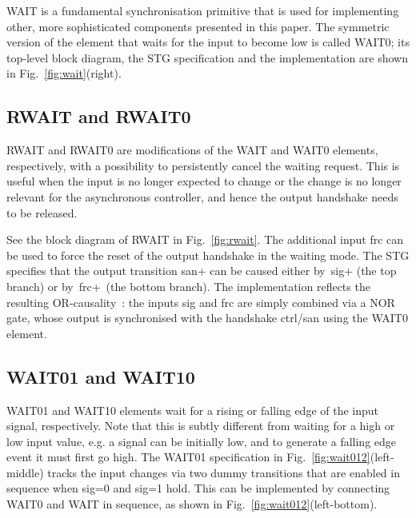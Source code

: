 \documentclass[conference]{IEEEtran}
\begin{document}
\textsf{WAIT} is a fundamental synchronisation primitive that is used for
implementing other, more sophisticated components presented in this paper.
The symmetric version of the element that waits for the input to become low is
called \textsf{WAIT0}; its top-level block diagram, the STG specification and
the implementation are shown in Fig.~\ref{fig:wait}(right).

\vspace{-0.5mm}
\subsection*{\textsf{RWAIT} and \textsf{RWAIT0}}
\vspace{-0.5mm}

\textsf{RWAIT} and \textsf{RWAIT0} are modifications of the \textsf{WAIT} and \textsf{WAIT0}
elements, respectively, with a possibility to persistently cancel the waiting request. This
is useful when the input is no longer expected to change or the change is no longer relevant
for the asynchronous controller, and hence the output handshake needs to be released.

See the block diagram of \textsf{RWAIT} in Fig.~\ref{fig:rwait}. The additional input
\textsf{frc} can be used to force the reset of the output handshake in the waiting mode. The
STG specifies that the output transition \textsf{san+} can be caused either by~\textsf{sig+}
(the top branch) or by~\textsf{frc+}~(the bottom branch). The implementation reflects the resulting
OR-causality~\cite{1996_yakovlev_or}: the inputs \textsf{sig} and \textsf{frc} are simply
combined via a NOR gate, whose output is synchronised with the handshake \textsf{ctrl/san}
using the \textsf{WAIT0} element.


\vspace{-0.5mm}
\subsection*{\textsf{WAIT01} and \textsf{WAIT10}}
\vspace{-0.5mm}

\textsf{WAIT01} and \textsf{WAIT10} elements wait for a rising or falling edge of the input
signal, respectively. Note that this is subtly different from waiting for a high or low input value,
e.g. a signal can be initially low, and to generate a falling edge event it must first go high.
The \textsf{WAIT01} specification in Fig.~\ref{fig:wait012}(left-middle) tracks the input changes
via two dummy transitions that are enabled in sequence when \textsf{sig=0} and \textsf{sig=1} hold.
This can be implemented by connecting \textsf{WAIT0} and \textsf{WAIT} in sequence,
as shown in Fig.~\ref{fig:wait012}(left-bottom).
\end{document}
